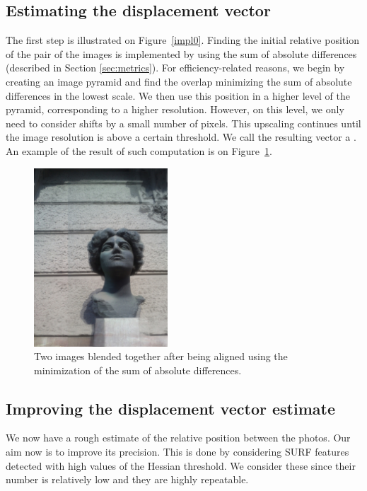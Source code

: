 \subsection{Estimating the displacement vector}
The first step is illustrated on Figure~\ref{impl0}.
Finding the initial relative position of the pair of the images is implemented by using the sum of absolute differences (described in Section \ref{sec:metrics}).
For efficiency-related reasons, we begin by creating an image pyramid and find the overlap minimizing the sum of absolute differences in the lowest scale. 
We then use this position in a higher level of the pyramid, corresponding to a higher resolution. 
However, on this level, we only need to consider shifts by a small number of pixels. 
This upscaling continues until the image resolution is above a certain threshold. 
We call the resulting vector a .
An example of the result of such computation is on Figure~\ref{emaover}.

\begin{figure}[H]
\centering
\includegraphics[width=5cm]{img/ema_overlap.png}
\caption{Two images blended together after being aligned using the minimization of the sum of absolute differences.}
\label{emaover}
\end{figure} 

\subsection{Improving the displacement vector estimate}
\label{sec:improving}

We now have a rough estimate of the relative position between the photos. 
Our aim now is to improve its precision.
This is done by considering SURF features detected with high values of the Hessian threshold. 
We consider these since their number is relatively low and they are highly repeatable. 

